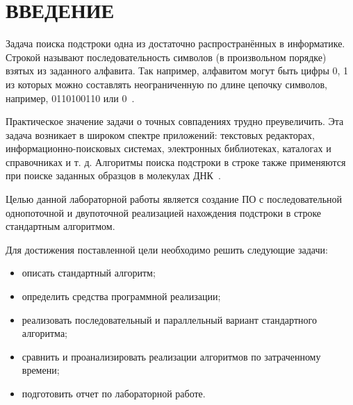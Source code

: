 \section*{ВВЕДЕНИЕ}

Задача поиска подстроки одна из достаточно распространённых в информатике. Строкой называют последовательность символов (в произвольном порядке) взятых из заданного алфавита. Так например, алфавитом могут быть цифры {0, 1} из которых можно составлять неограниченную по длине цепочку символов, например, 0110100110 или 0~\cite{max}. 

Практическое значение задачи о точных совпадениях трудно преувеличить. 
Эта задача возникает в широком спектре приложений: текстовых редакторах, информационно-поисковых системах, электронных библиотеках, каталогах и справочниках и т. д. 
Алгоритмы поиска подстроки в строке также применяются при поиске заданных образцов в молекулах ДНК~\cite{алексеенко2010информационная}.

Целью данной лабораторной работы является создание ПО с последовательной однопоточной и двупоточной реализацией нахождения подстроки в строке стандартным алгоритмом.

Для достижения поставленной цели необходимо решить следующие задачи:
\begin{itemize}
	\item описать стандартный алгоритм;
	\item определить средства программной реализации;
	\item реализовать последовательный и параллельный вариант стандартного алгоритма;
	\item сравнить и проанализировать реализации алгоритмов по затраченному времени;
	\item подготовить отчет по лабораторной работе.
\end{itemize}